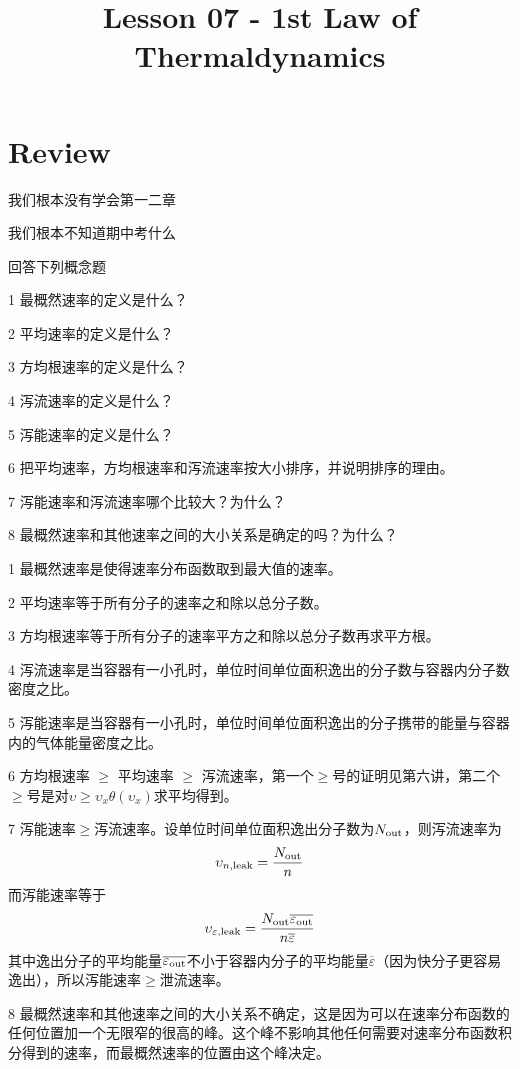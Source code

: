 \documentclass[CJK]{beamer}
\title{Lesson 07 - 1st Law of Thermaldynamics}
\author{}
\date{}
\begin{document}


\section{Review}

\begin{frame}
\bch
\bitem
\item{我们根本没有学会第一二章}
\item{我们根本不知道期中考什么}
\eitem
\ech
\end{frame}

\begin{frame}
\bch
回答下列概念题
\bitem
\item[1]{最概然速率的定义是什么？}
\item[2]{平均速率的定义是什么？}
\item[3]{方均根速率的定义是什么？}
\item[4]{泻流速率的定义是什么？}
\item[5]{泻能速率的定义是什么？}
\item[6]{把平均速率，方均根速率和泻流速率按大小排序，并说明排序的理由。}
\item[7]{泻能速率和泻流速率哪个比较大？为什么？}
\item[8]{最概然速率和其他速率之间的大小关系是确定的吗？为什么？}
\eitem

\ech
\end{frame}

\begin{frame}
\bch
{\scriptsize
\bitem
\item[1]{最概然速率是使得速率分布函数取到最大值的速率。}
\item[2]{平均速率等于所有分子的速率之和除以总分子数。}
\item[3]{方均根速率等于所有分子的速率平方之和除以总分子数再求平方根。}
\item[4]{泻流速率是当容器有一小孔时，单位时间单位面积逸出的分子数与容器内分子数密度之比。}
\item[5]{泻能速率是当容器有一小孔时，单位时间单位面积逸出的分子携带的能量与容器内的气体能量密度之比。}
\item[6]{方均根速率 $\ge$ 平均速率 $\ge$ 泻流速率，第一个$\ge$号的证明见第六讲，第二个$\ge$号是对$\upsilon\ge \upsilon_x\theta(\upsilon_x)$求平均得到。 }
\item[7]{泻能速率$\ge$泻流速率。设单位时间单位面积逸出分子数为$N_{\rm out}$，则泻流速率为
$$ \upsilon_{n,\rm leak} = \frac{N_{\rm out}}{n} $$
而泻能速率等于
$$ \upsilon_{\varepsilon,\rm leak} = \frac{N_{\rm out}\overline{\varepsilon_{\rm out}}}{n\overline{\varepsilon}} $$
其中逸出分子的平均能量$\overline{\varepsilon_{\rm out}}$不小于容器内分子的平均能量$\overline{\varepsilon}$（因为快分子更容易逸出），所以泻能速率$\ge$泄流速率。
}
\item[8]{最概然速率和其他速率之间的大小关系不确定，这是因为可以在速率分布函数的任何位置加一个无限窄的很高的峰。这个峰不影响其他任何需要对速率分布函数积分得到的速率，而最概然速率的位置由这个峰决定。}
\eitem
}
\ech
\end{frame}
\end{document}
